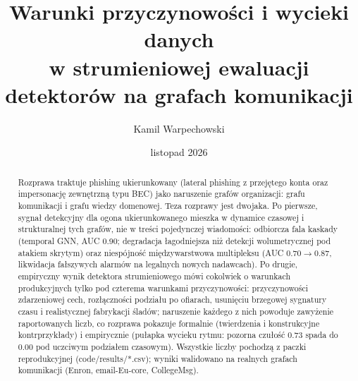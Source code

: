 \documentclass[12pt,a4paper,oneside]{report}
\title{Warunki przyczynowości i wycieki danych\\
w strumieniowej ewaluacji detektorów na grafach komunikacji}
\author{Kamil Warpechowski}
\date{listopad 2026}
\begin{document}
\maketitle

\begin{abstract}
Rozprawa traktuje phishing ukierunkowany (lateral phishing z przejętego konta
oraz impersonację zewnętrzną typu BEC) jako naruszenie grafów organizacji:
grafu komunikacji i grafu wiedzy domenowej. Teza rozprawy jest dwojaka.
Po pierwsze, sygnał detekcyjny dla ogona ukierunkowanego mieszka w dynamice
czasowej i strukturalnej tych grafów, nie w treści pojedynczej wiadomości:
odbiorcza fala kaskady (temporal GNN, AUC 0.90; degradacja łagodniejsza niż
detekcji wolumetrycznej pod atakiem skrytym) oraz niespójność międzywarstwowa
multipleksu (AUC 0.70$\to$0.87, likwidacja fałszywych alarmów na legalnych
nowych nadawcach). Po drugie, empiryczny wynik detektora strumieniowego mówi
cokolwiek o warunkach produkcyjnych tylko pod czterema warunkami
przyczynowości: przyczynowości zdarzeniowej cech, rozłączności podziału po
ofiarach, usunięciu brzegowej sygnatury czasu i realistycznej fabrykacji
śladów; naruszenie każdego z nich powoduje zawyżenie raportowanych liczb, co rozprawa
pokazuje formalnie (twierdzenia i konstrukcyjne kontrprzykłady) i empirycznie
(pułapka wycieku rytmu: pozorna czułość 0.73 spada do 0.00 pod uczciwym
podziałem czasowym). Wszystkie liczby pochodzą z paczki reprodukcyjnej
(code/results/*.csv); wyniki walidowano na realnych grafach komunikacji
(Enron, email-Eu-core, CollegeMsg).
\end{abstract}

\tableofcontents











\end{document}
